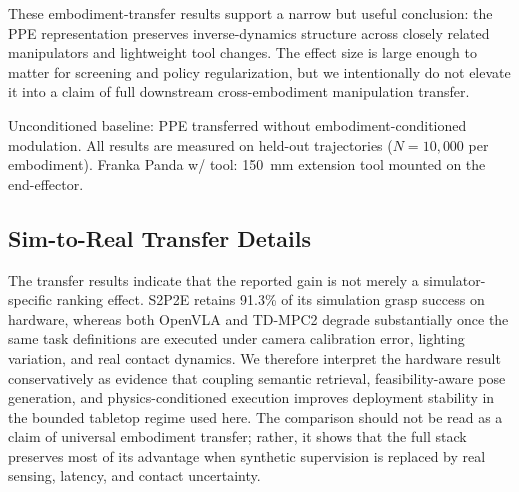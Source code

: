 \documentclass[12pt]{article}
\begin{document}
These embodiment-transfer results support a narrow but useful conclusion: the PPE representation preserves inverse-dynamics structure across closely related manipulators and lightweight tool changes. The effect size is large enough to matter for screening and policy regularization, but we intentionally do not elevate it into a claim of full downstream cross-embodiment manipulation transfer.

\begin{table}[!htbp]
\centering
\caption{Cross-embodiment transfer: PPE inverse-dynamics RMSE (N$\cdot$m, mean $\pm$ SD) and percentage improvement over unconditioned baseline.}
\label{tab:cross_embodiment}
\small
\setlength{\tabcolsep}{4pt}
\par\smallskip\footnotesize
Unconditioned baseline: PPE transferred without embodiment-conditioned modulation. All results are measured on held-out trajectories ($N=10{,}000$ per embodiment). Franka Panda w/ tool: 150~mm extension tool mounted on the end-effector.
\end{table}

\FloatBarrier
\subsection{Sim-to-Real Transfer Details}

The transfer results indicate that the reported gain is not merely a simulator-specific ranking effect. S2P2E retains 91.3\% of its simulation grasp success on hardware, whereas both OpenVLA and TD-MPC2 degrade substantially once the same task definitions are executed under camera calibration error, lighting variation, and real contact dynamics. We therefore interpret the hardware result conservatively as evidence that coupling semantic retrieval, feasibility-aware pose generation, and physics-conditioned execution improves deployment stability in the bounded tabletop regime used here. The comparison should not be read as a claim of universal embodiment transfer; rather, it shows that the full stack preserves most of its advantage when synthetic supervision is replaced by real sensing, latency, and contact uncertainty.
\end{document}
